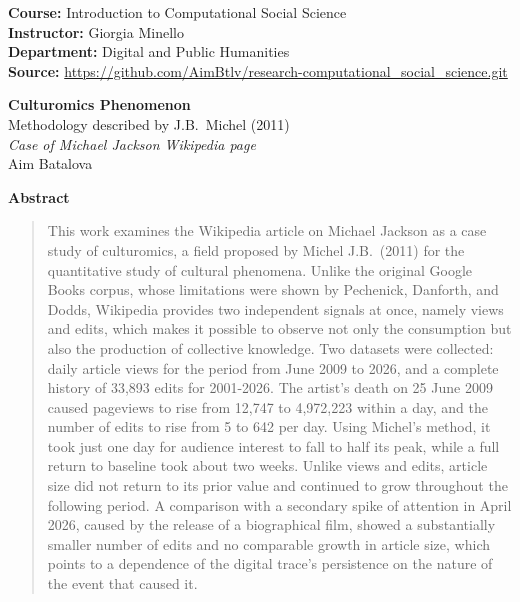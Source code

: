 \documentclass[11pt]{article}
\begin{document}
\begin{flushleft}
\textbf{Course:} Introduction to Computational Social Science\\
\textbf{Instructor:} Giorgia Minello\\
\textbf{Department:} Digital and Public Humanities\\
\textbf{Source:} \url{https://github.com/AimBtlv/research-computational_social_science.git}
\end{flushleft}

\vspace{1.2cm}


\begin{center}
{\LARGE\bfseries Culturomics Phenomenon}\\[6pt]
{\large Methodology described by J.B.~Michel (2011)}\\[2pt]
{\large\itshape Case of Michael Jackson Wikipedia page}\\[10pt]
{\normalsize Aim Batalova}
\end{center}

\vspace{0.8cm}

\begin{center}\textbf{Abstract}\end{center}
\begin{quotation}
\noindent
\noindent
This work examines the Wikipedia article on Michael Jackson as a case study of culturomics, a field proposed by Michel J.B.\ (2011) for the quantitative study of cultural phenomena. Unlike the original Google Books corpus, whose limitations were shown by Pechenick, Danforth, and Dodds, Wikipedia provides two independent signals at once, namely views and edits, which makes it possible to observe not only the consumption but also the production of collective knowledge. Two datasets were collected: daily article views for the period from June 2009 to 2026, and a complete history of 33,893 edits for 2001-2026. The artist's death on 25 June 2009 caused pageviews to rise from 12{,}747 to 4{,}972{,}223 within a day, and the number of edits to rise from 5 to 642 per day. Using Michel's method, it took just one day for audience interest to fall to half its peak, while a full return to baseline took about two weeks. Unlike views and edits, article size did not return to its prior value and continued to grow throughout the following period. A comparison with a secondary spike of attention in April 2026, caused by the release of a biographical film, showed a substantially smaller number of edits and no comparable growth in article size, which points to a dependence of the digital trace's persistence on the nature of the event that caused it.
\end{quotation}
\end{document}
